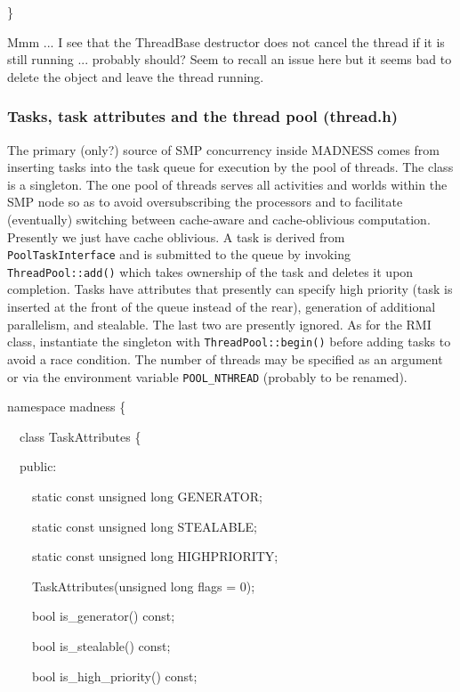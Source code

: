 \documentclass[letterpaper]{article}
\begin{document}
{\ttfamily
\}}


\bigskip

Mmm ... I see that the ThreadBase destructor does not cancel the thread if it is still running ... probably should? Seem
to recall an issue here but it seems bad to delete the object and leave the thread running. 

\subsubsection{Tasks, task attributes and the thread pool (thread.h)}
The primary (only?) source of SMP concurrency inside MADNESS comes from inserting tasks into the task queue for
execution by the pool of threads. The class is a singleton. The one pool of threads serves all activities and worlds
within the SMP node so as to avoid oversubscribing the processors and to facilitate (eventually) switching between
cache-aware and cache-oblivious computation. Presently we just have cache oblivious. A task is derived from
\texttt{PoolTaskInterface} and is submitted to the queue by invoking \texttt{ThreadPool::add()} which takes ownership
of the task and deletes it upon completion. Tasks have attributes that presently can specify high priority (task is
inserted at the front of the queue instead of the rear), generation of additional parallelism, and stealable. The last
two are presently ignored. As for the RMI class, instantiate the singleton with \texttt{ThreadPool::begin()} before
adding tasks to avoid a race condition. The number of threads may be specified as an argument or via the environment
variable \texttt{POOL\_NTHREAD} (probably to be renamed).

{\ttfamily
namespace madness \{}

{\ttfamily
\ \ class TaskAttributes \{}

{\ttfamily
\ \ public:}

{\ttfamily
\ \ \ \ static const unsigned long GENERATOR;}

{\ttfamily
\ \ \ \ static const unsigned long STEALABLE;}

{\ttfamily
\ \ \ \ static const unsigned long HIGHPRIORITY;}

{\ttfamily
\ \ \ \ TaskAttributes(unsigned long flags = 0);}

{\ttfamily
\ \ \ \ bool is\_generator() const;}

{\ttfamily
\ \ \ \ bool is\_stealable() const;}

{\ttfamily
\ \ \ \ bool is\_high\_priority() const;}
\end{document}
